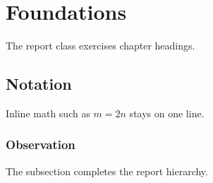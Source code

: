 \documentclass{report}
\begin{document}
\chapter{Foundations}
The report class exercises chapter headings.

\section{Notation}
Inline math such as $m = 2n$ stays on one line.

\subsection{Observation}
The subsection completes the report hierarchy.
\end{document}
